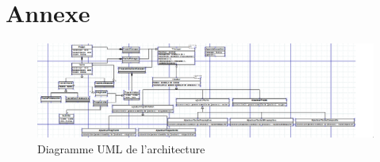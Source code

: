 \chapter{Annexe}

\begin{figure}[h]
   \includegraphics{ressources/UML.PNG}
   \caption{\label{Annexe 1} Diagramme UML de l'architecture}
\end{figure}